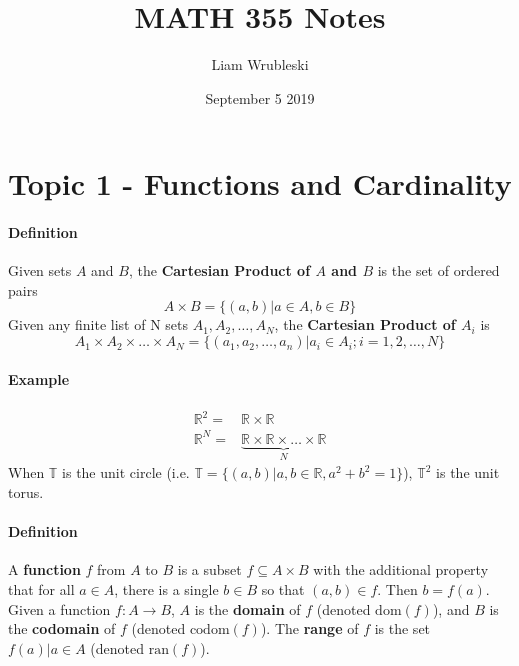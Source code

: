 \documentclass{article}
\title{MATH 355 Notes}
\author{Liam Wrubleski}
\date{September 5 2019}
\newcommand{\mapab}[2]{{#1}\xrightarrow{}{#2}}
\begin{document}
	\maketitle
	
	\section{Topic 1 - Functions and Cardinality}
	\paragraph{Definition} Given sets $A$ and $B$, the \textbf{Cartesian Product of $A$ and $B$} is the set of ordered pairs
	\begin{equation*}
		A\times B = \{(a,b)|a\in A, b \in B\}
	\end{equation*}
	Given any finite list of N sets $A_1, A_2,\dots,A_N$, the \textbf{Cartesian Product of $A_i$} is
	\begin{equation*}
		A_1\times A_2\times\dots\times A_N = \{(a_1,a_2,\dots,a_n)|a_i\in A_i; i=1,2,\dots,N\}
	\end{equation*}
	\paragraph{Example}
	\begin{align*}
	\mathbb{R}^2 =& \mathbb{R}\times\mathbb{R} \\
	\mathbb{R}^N =& \underbrace{\mathbb{R}\times\mathbb{R}\times\dots\times\mathbb{R}}_N
	\end{align*}
	When $\mathbb{T}$ is the unit circle (i.e. $\mathbb{T} = \{(a,b)|a,b\in \mathbb{R}, a^2+b^2=1\}$), $\mathbb{T}^2$ is the unit torus.
	\paragraph{Definition}
	A \textbf{function} $f$ from $A$ to $B$ is a subset $f \subseteq A\times B$ with the additional property that for all $a\in A$, there is a single $b \in B$ so that $(a,b) \in f$. Then $b = f(a)$.
	Given a function $f: \mapab{A}{B}$, $A$ is the \textbf{domain} of $f$ (denoted $\textrm{dom}(f)$), and $B$ is the \textbf{codomain} of $f$ (denoted $\textrm{codom}(f)$). The \textbf{range} of $f$ is the set ${f(a)|a \in A}$ (denoted $\textrm{ran}(f)$).
\end{document}

